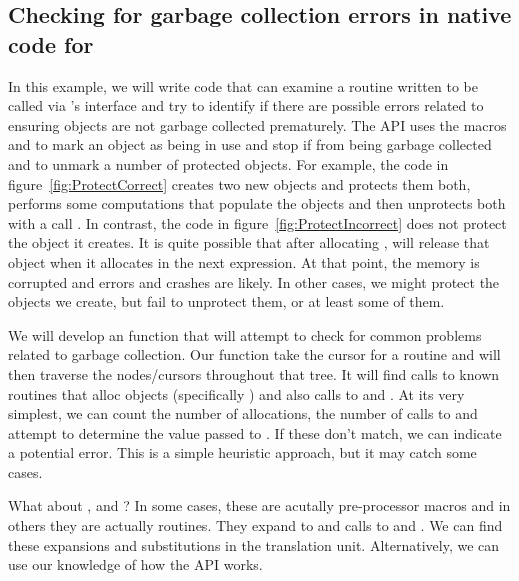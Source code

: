\subsection[Checking for garbage collection errors in native code for R]{Checking for garbage collection errors in native code for \R{}}\label{sec:ProtectEG}
In this example, we will write code that can examine a \C{} routine
written to be called via \R's  interface and try to
identify if there are possible errors related to ensuring \R{} objects
are not garbage collected prematurely.  The \R{} API uses the macros
 and  to mark an object as being in
use and stop if from being garbage collected and to unmark a number of
protected objects.  For example, the \C{} code in
figure~\ref{fig:ProtectCorrect} creates two new \R{} objects and
protects them both, performs some computations that populate the
objects and then unprotects both with a call .  In
contrast, the code in figure~\ref{fig:ProtectIncorrect} does not
protect the \R{} object it creates.  It is quite possible that after
allocating , \R{} will release that object when it allocates
 in the next expression. At that point, the memory is
corrupted and errors and crashes are likely.
In other cases, we might protect the \R{} objects we create,
but fail to unprotect them, or at least some of them.



We will develop an \R{} function that will attempt to check for common
problems related to garbage collection.  Our function take the
\libclang{} cursor for a routine and will then traverse the
nodes/cursors throughout that tree. It will find calls to known
routines that alloc \R{} objects (specifically )
and also calls to  and .  At its
very simplest, we can count the number of allocations, the number of
calls to  and attempt to determine the value passed
to .  If these don't match, we can indicate a
potential error.  This is a simple heuristic approach, but it may
catch some cases.

What about ,  and ?
In some cases, these are acutally pre-processor macros and in others
they are actually routines. They expand to
 and calls to  and
.  We can find these expansions and substitutions
in the translation unit. Alternatively, we can use our knowledge of
how the \R{} API works.


